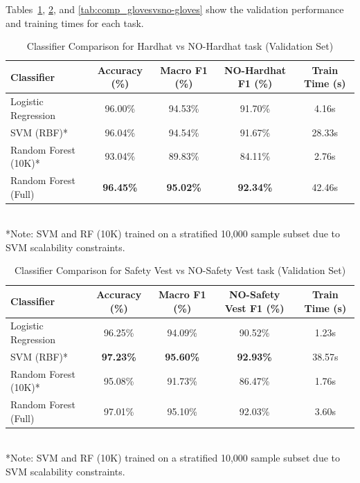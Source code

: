 \documentclass[11pt,a4paper]{article}
\begin{document}
Tables~\ref{tab:comp_hardhatvsno-hardhat}, \ref{tab:comp_safetyvestvsno-safetyvest}, and \ref{tab:comp_glovesvsno-gloves} show the validation performance and training times for each task.

\begin{table}[h]
  \centering
  \caption{Classifier Comparison for Hardhat vs NO-Hardhat task (Validation Set)}
  \begin{tabular}{lcccc}
    \hline
    Classifier & Accuracy (\%) & Macro F1 (\%) & NO-Hardhat F1 (\%) & Train Time (s) \\
    \hline
    Logistic Regression & 96.00\% & 94.53\% & 91.70\% & 4.16s \\
    SVM (RBF)* & 96.04\% & 94.54\% & 91.67\% & 28.33s \\
    Random Forest (10K)* & 93.04\% & 89.83\% & 84.11\% & 2.76s \\
    Random Forest (Full) & \textbf{96.45\%} & \textbf{95.02\%} & \textbf{92.34\%} & 42.46s \\
    \hline
  \end{tabular}
  \\ \vspace{1mm} \small{*Note: SVM and RF (10K) trained on a stratified 10,000 sample subset due to SVM scalability constraints.}
  \label{tab:comp_hardhatvsno-hardhat}
\end{table}

\begin{table}[h]
  \centering
  \caption{Classifier Comparison for Safety Vest vs NO-Safety Vest task (Validation Set)}
  \begin{tabular}{lcccc}
    \hline
    Classifier & Accuracy (\%) & Macro F1 (\%) & NO-Safety Vest F1 (\%) & Train Time (s) \\
    \hline
    Logistic Regression & 96.25\% & 94.09\% & 90.52\% & 1.23s \\
    SVM (RBF)* & \textbf{97.23\%} & \textbf{95.60\%} & \textbf{92.93\%} & 38.57s \\
    Random Forest (10K)* & 95.08\% & 91.73\% & 86.47\% & 1.76s \\
    Random Forest (Full) & 97.01\% & 95.10\% & 92.03\% & 3.60s \\
    \hline
  \end{tabular}
  \\ \vspace{1mm} \small{*Note: SVM and RF (10K) trained on a stratified 10,000 sample subset due to SVM scalability constraints.}
  \label{tab:comp_safetyvestvsno-safetyvest}
\end{table}
\end{document}
